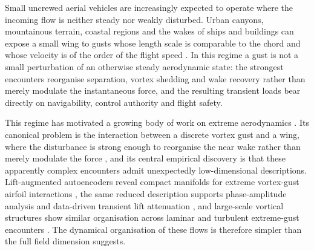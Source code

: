 
Small uncrewed aerial vehicles are increasingly expected to operate where the incoming flow is neither steady nor weakly disturbed. Urban canyons, mountainous terrain, coastal regions and the wakes of ships and buildings can expose a small wing to gusts whose length scale is comparable to the chord and whose velocity is of the order of the flight speed \citep{jones2022,mohamed2023gusts,fukami2023}. In this regime a gust is not a small perturbation of an otherwise steady aerodynamic state: the strongest encounters reorganise separation, vortex shedding and wake recovery rather than merely modulate the instantaneous force, and the resulting transient loads bear directly on navigability, control authority and flight safety.\re

This regime has motivated a growing body of work on extreme aerodynamics \citep{taira2026extreme}. Its canonical problem is the interaction between a discrete vortex gust and a wing, where the disturbance is strong enough to reorganise the near wake rather than merely modulate the force \citep{fukami2025prf}, and its central empirical discovery is that these apparently complex encounters admit unexpectedly low-dimensional descriptions. Lift-augmented autoencoders reveal compact manifolds for extreme vortex-gust airfoil interactions \citep{fukami2023}, the same reduced description supports phase-amplitude analysis and data-driven transient lift attenuation \citep{fukami2024control}, and large-scale vortical structures show similar organisation across laminar and turbulent extreme-gust encounters \citep{odaka2026}. The dynamical organisation of these flows is therefore simpler than the full field dimension suggests.\re

